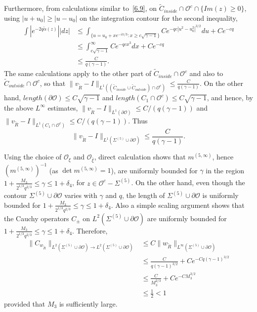\documentclass{amsart}
\theoremstyle{definition}
\theoremstyle{remark}
\numberwithin{equation}{section}
\newcommand{\wt}{\widetilde}
\begin{document}
Furthermore, from calculations similar to~\eqref{6.9},  
on $\wt{C}_{inside}\cap\mathcal{O}^c\cap \{Im(z)\geq0\}$,  
using $|u+u_0|\geq |u-u_0|$ on the integration contour for the second inequality, 
\begin{equation}
  \begin{split}
    \int |e^{-2q\wt{\alpha}(z)}||dz|
    &\le \int_{\{u=u_0+xe^{-i\pi/3} : x\geq c\sqrt{\gamma-1}\}}
Ce^{-qc|u^2-u^2_0|^{3/2}}du + Ce^{-cq}\\
    &\le \int_{c\sqrt{\gamma-1}}^{\infty} 
Ce^{-qcx^{3}} dx + Ce^{-cq}\\
    &\le  \frac{C}{q(\gamma-1)}.
  \end{split}
\end{equation}
The same calculations apply to the other part of 
$\wt{C}_{inside}\cap\mathcal{O}^c$ and also 
to $\wt{C}_{outside}\cap\mathcal{O}^c$, 
so that 
$\|v_{\wt{R}}-I\|_{L^1((\wt{C}_{inside}\cup\wt{C}_{outside})\cap\mathcal{O}^c)}
\le \frac{C}{q(\gamma-1)}$.
On the other hand, $length(\partial\mathcal{O})\le C\sqrt{\gamma-1}$ and 
$length(C_1\cap\mathcal{O}^c)\le C\sqrt{\gamma-1}$, and hence, by the 
above $L^\infty$ estimates,  
$\|v_{\wt{R}}-I\|_{L^1(\partial\mathcal{O})}\le C/(q(\gamma-1))$ and 
$\|v_{\wt{R}}-I\|_{L^1(C_1\cap\mathcal{O}^c)}\le C/(q(\gamma-1))$.
Thus 
\begin{equation}\label{e-z33}
   \|v_{\wt{R}}-I\|_{L^1(\Sigma^{(5)}\cup\partial\mathcal{O})}\le 
\frac{C}{q(\gamma-1)}.
\end{equation}

Using the choice of $\mathcal{O}_{\xi}$ and $\mathcal{O}_{\bar{\xi}}$, direct 
calculation shows that $m^{(5,\infty)}$, hence $(m^{(5,\infty)})^{-1}$ (as 
$\det m^{(5,\infty)}=1$), are uniformly bounded for $\gamma$ in the region 
$1+\frac{M_3}{2^{1/3}q^{2/3}}\le \gamma \le 1+\delta_4$,  
for $z\in\mathcal{O}^c - \Sigma^{(5)}$.
On the other hand, even though the contour $\Sigma^{(5)}\cup\partial\mathcal{O}$ 
varies with $\gamma$ and $q$, the length of $\Sigma^{(5)}\cup\partial\mathcal{O}$ 
is uniformly bounded for $1+\frac{M_3}{2^{1/3}q^{2/3}}\le \gamma \le 1+\delta_4$.
Also a simple scaling argument shows that the Cauchy operators $C_\pm$ on 
$L^2(\Sigma^{(5)}\cup\partial\mathcal{O})$ are uniformly bounded for 
$1+\frac{M_3}{2^{1/3}q^{2/3}}\le \gamma \le 1+\delta_4$.
Therefore,  
\begin{equation}\label{e-z28}
  \begin{split}
    \|C_{w_{\wt{R}}}\|_{L^2(\Sigma^{(5)}\cup\partial\mathcal{O})
\to L^2(\Sigma^{(5)}\cup\partial\mathcal{O})} 
&\le C\|w_{\wt{R}}\|_{L^\infty(\Sigma^{(5)}\cup\partial\mathcal{O})}\\
    &\le \frac{C}{q(\gamma-1)^{3/2}}+Ce^{-Cq(\gamma-1)^{3/2}}\\
    &\le \frac{C}{M_3^{2/3}}+Ce^{-CM_3^{3/2}}\\
    &\le \frac12 <1
  \end{split}
\end{equation}
provided that $M_3$ is sufficiently large.
\end{document}
